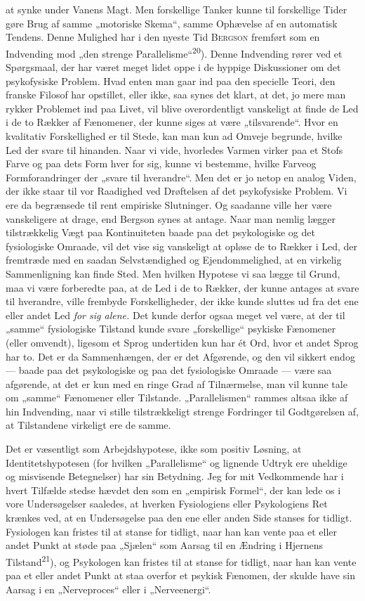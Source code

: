 \documentclass[12pt,a4paper,openany]{book}
\newcommand{\opage}[1]{\marginnote{\footnotesize\textit{[#1]}}}
\begin{document}
at synke under Vanens Magt. Men forskellige Tanker kunne til forskellige Tider
gøre Brug af samme „motoriske Skema“, samme Ophævelse af en automatisk Tendens.
Denne Mulighed har i den nyeste Tid \textsc{Bergson} fremført som en Indvending
mod „den strenge Parallelisme“\textsuperscript{20}). Denne Indvending rører ved
et Spørgsmaal, der har været meget lidet oppe i de hyppige Diskussioner om det
psykofysiske Problem. Hvad enten man gaar ind paa den specielle Teori, den
franske Filosof har opstillet, eller ikke, saa synes det klart, at det, jo mere
man rykker Problemet ind paa Livet, vil blive overordentligt vanskeligt at
finde de Led i de to Rækker af Fænomener, der kunne siges at være
„tilsvarende“. Hvor en kvalitativ Forskellighed er til Stede, kan man kun ad
Omveje begrunde, hvilke Led der svare til hinanden. Naar vi vide, hvorledes
Varmen virker paa et Stofs Farve og paa dets Form hver for sig, kunne vi
bestemme, hvilke Farveog Formforandringer der „svare til hverandre“. Men det er
jo netop en analog Viden, der ikke staar til vor Raadighed ved Drøftelsen af
det psykofysiske Problem. Vi ere da begrænsede til rent empiriske Slutninger.
Og saadanne ville her være vanskeligere at drage, end Bergson synes at antage.
Naar man nemlig lægger tilstrækkelig Vægt paa Kontinuiteten baade paa det
psykologiske og det fysiologiske Omraade, vil det vise sig vanskeligt at opløse
de to Rækker i Led, der fremtræde med en saadan Selvstændighed og
Ejendommelighed, at en virkelig Sammenligning kan finde Sted. Men hvilken
Hypotese vi saa lægge til Grund, maa vi være forberedte paa, at de Led i de to
Rækker, der kunne antages at svare til hverandre, ville frembyde
Forskelligheder, der ikke kunde sluttes ud fra det ene eller andet Led
\textit{for sig alene.} Det kunde derfor ogsaa meget vel være, at der til
„samme“ fysiologiske Tilstand kunde svare „forskellige“ psykiske Fænomener
(eller omvendt), ligesom et Sprog undertiden kun har ét Ord, hvor et andet
Sprog har to.
\opage{25}Det er da Sammenhængen, der er det Afgørende, og den vil sikkert
endog --- baade paa det psykologiske og paa det fysiologiske Omraade --- være
saa afgørende, at det er kun med en ringe Grad af Tilnærmelse, man vil kunne
tale om „samme“ Fænomener eller Tilstande. „Parallelismen“ rammes altsaa ikke
af hin Indvending, naar vi stille tilstrækkeligt strenge Fordringer til
Godtgørelsen af, at Tilstandene virkeligt ere de samme.

Det er væsentligt som Arbejdshypotese, ikke som positiv Løsning, at
Identitetshypotesen (for hvilken „Parallelisme“ og lignende Udtryk ere uheldige
og misvisende Betegnelser) har sin Betydning. Jeg for mit Vedkommende har i
hvert Tilfælde stedse hævdet den som en „empirisk Formel“, der kan lede os i
vore Undersøgelser saaledes, at hverken Fysiologiens eller Psykologiens Ret
krænkes ved, at en Undersøgelse paa den ene eller anden Side stanses for
tidligt. Fysiologen kan fristes til at stanse for tidligt, naar han kan vente
paa et eller andet Punkt at støde paa „Sjælen“ som Aarsag til en Ændring i
Hjernens Tilstand\textsuperscript{21}), og Psykologen kan fristes til at stanse
for tidligt, naar han kan vente paa et eller andet Punkt at staa overfor et
psykisk Fænomen, der skulde have sin Aarsag i en „Nerveproces“ eller i „Nerveenergi“.
\end{document}
